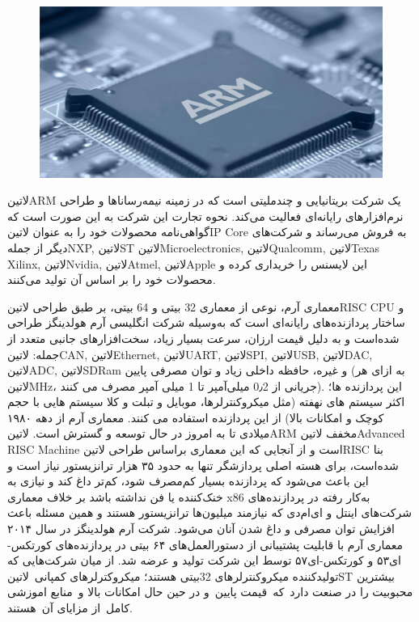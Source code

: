 \begin{figure}[!h]
	\centering
	\includegraphics[width=0.7\linewidth]{Assets/arm.png}
\end{figure}

‌لاتین{ARM} یک شرکت بریتانیایی و چندملیتی است که در زمینه نیمه‌‌رساناها و طراحی نرم‌افزارهای رایانه‌ای فعالیت می‌کند. نحوه تجارت این شرکت به این صورت است که گواهی‌نامه محصولات خود را به عنوان ‌لاتین{IP Core} به فروش می‌رساند و شرکت‌های دیگر از جملهNXP,  ‌لاتین{ST} ‌لاتین{Microelectronics}, ‌لاتین{Qualcomm}, ‌لاتین{Texas Xilinx}, ‌لاتین{Nvidia}, ‌لاتین{Atmel}, ‌لاتین{Apple} این لایسنس را خریداری کرده و محصولات خود را بر اساس آن تولید می‌کنند.

معماری آرم، نوعی از معماری 32 بیتی و 64 بیتی، بر طبق طراحی ‌لاتین{RISC CPU} و ساختار پردازنده‌های رایانه‌ای است که به‌وسیله شرکت انگلیسی آرم هولدینگز طراحی شده‌است و به دلیل قیمت ارزان، سرعت بسیار زیاد، سخت‌‌افزارهای جانبی متعدد از جمله: ‌لاتین{CAN}, ‌لاتین{Ethernet}, ‌لاتین{UART}, ‌لاتین{SPI}, ‌لاتین{USB}, ‌لاتین{DAC}, ‌لاتین{ADC}, ‌لاتین{SDRam} و غیره، حافظه داخلی زیاد و توان مصرفی پایین (به ازای هر ‌لاتین{MHz}، جریانی از 0٫2 میلی‌آمپر تا 1 میلی آمپر مصرف می کنند). این پردازنده ها؛ اکثر سیستم های نهفته (مثل میکروکنترلرها، موبایل و تبلت و کلا سیستم هایی با حجم کوچک و امکانات بالا) از این پردازنده استفاده می کنند. معماری آرم از دهه ۱۹۸۰ میلادی تا به امروز در حال توسعه و گسترش است. ‌لاتین{ARM} مخفف ‌لاتین{Advanced RISC Machine} است و از آنجایی که این معماری براساس طراحی ‌لاتین{RISC} بنا شده‌‌است، برای هسته اصلی پردازشگر تنها به حدود ۳۵ هزار ترانزیستور نیاز است و این باعث می‌شود که پردازنده بسیار کم‌مصرف شود، کم‌تر داغ کند و نیازی به خنک‌کننده یا فن نداشته باشد بر خلاف معماری x86 به‌کار رفته در پردازنده‌های شرکت‌های اینتل و ای‌ام‌دی که نیازمند میلیون‌ها ترانزیستور هستند و همین مسئله باعث افزایش توان مصرفی و داغ شدن آنان می‌شود. شرکت آرم هولدینگز در سال ۲۰۱۴ معماری آرم با قابلیت پشتیبانی از دستورالعمل‌های ۶۴ بیتی در پردازنده‌های کورتکس-ای۵۳ و کورتکس-ای۵۷ توسط این شرکت تولید و عرضه شد.
از میان شرکت‌هایی که تولیدکننده میکروکنترلرهای 32بیتی هستند؛ میکروکترلرهای کمپانی ‌لاتین{ST} بیشترین محبوبیت را در صنعت دارد که قیمت پایین و در حین حال امکانات بالا و منابع اموزشی کامل از مزایای آن هستند.

